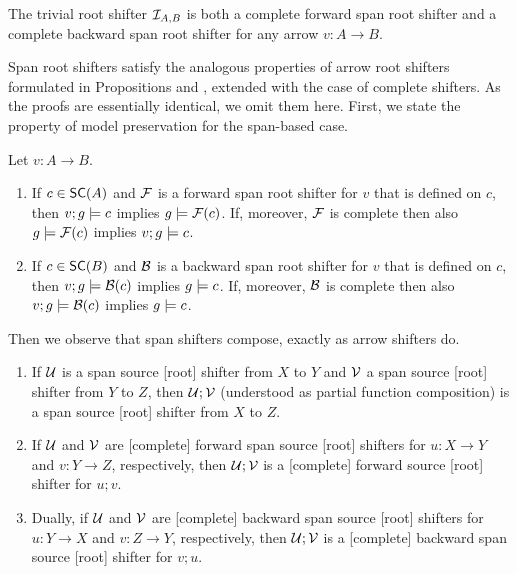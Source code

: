 \begin{proposition}
The trivial root shifter $\mathcal{I}_{A,B}$ is both a complete forward span root shifter and a complete backward span root shifter for any arrow $v:A\to B$. 
\end{proposition}
%
Span root shifters satisfy the analogous properties of arrow root shifters formulated in Propositions  and , extended with the case of complete shifters. As the proofs are essentially identical, we omit them here. First, we state the property of model preservation for the span-based case.

\begin{proposition}
Let $v:A\to B$.
\begin{enumerate}[topsep=\smallskipamount]
\item If $c\in \SC A$ and $\mathcal{F}$ is a forward span root shifter for $v$ that is defined on $c$, then $v;g\models c$ implies $g\models \mathcal{F}(c)$. If, moreover, $\mathcal{F}$ is complete then also $g\models \mathcal{F}(c)$ implies $v;g\models c$.
\item If $c\in \SC B$ and $\mathcal{B}$ is a backward span root shifter for $v$ that is defined on $c$, then $v;g\models \mathcal{B}(c)$ implies $g\models c$. If, moreover, $\mathcal{B}$ is complete then also $v;g\models \mathcal{B}(c)$ implies $g\models c$.
\end{enumerate}
\end{proposition}
%
Then we observe that span shifters compose, exactly as arrow shifters do.
%
\begin{proposition}
\begin{enumerate}[topsep=\smallskipamount]
\item If $\mathcal{U}$ is a span source [root] shifter from $X$ to $Y$ and $\mathcal{V}$ a span source [root] shifter from $Y$ to $Z$, then $\mathcal{U};\mathcal{V}$ (understood as partial function composition) is a span source [root] shifter from $X$ to $Z$. 
\item If $\mathcal{U}$ and $\mathcal{V}$ are [complete] forward span source [root] shifters for $u: X\to Y$ and $v: Y \to Z$, respectively, then $\mathcal{U};\mathcal{V}$ is a [complete] forward source [root] shifter for $u;v$.
\item Dually, if $\mathcal{U}$ and $\mathcal{V}$ are [complete] backward span source [root] shifters for $u: Y\to X$ and $v: Z \to Y$, respectively, then $\mathcal{U};\mathcal{V}$ is a [complete] backward span source [root] shifter for $v;u$.
\end{enumerate}
\end{proposition}
